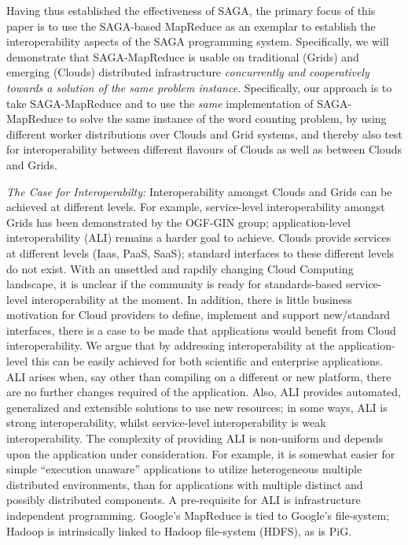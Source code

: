 \documentclass[conference,final]{IEEEtran}
\newcommand{\sagamapreduce }{SAGA-MapReduce }
\begin{document}
Having thus established the effectiveness of SAGA, the primary focus
of this paper is to use the SAGA-based MapReduce as an exemplar to
establish the interoperability aspects of the SAGA programming system.
Specifically, we will demonstrate that \sagamapreduce is usable on
traditional (Grids) and emerging (Clouds) distributed infrastructure
{\it concurrently and cooperatively towards a solution of the same
  problem instance}.  Specifically, our approach is to take
\sagamapreduce and to use the {\it same} implementation of
\sagamapreduce to solve the same instance of the word counting
problem, by using different worker distributions over Clouds and Grid
systems, and thereby also test for interoperability between different
flavours of Clouds as well as between Clouds and Grids.

{\it The Case for Interoperabilty:} Interoperability amongst Clouds
and Grids can be achieved at different levels. For example,
service-level interoperability amongst Grids has been demonstrated by
the OGF-GIN group; application-level interoperability (ALI) remains a
harder goal to achieve.  Clouds provide services at different levels
(Iaas, PaaS, SaaS); standard interfaces to these different levels do
not exist.  With an unsettled and rapdily changing Cloud Computing
landscape, it is unclear if the community is ready for standards-based
service-level interoperability at the moment.  In addition, there is
little business motivation for Cloud providers to define, implement
and support new/standard interfaces, there is a case to be made that
applications would benefit from Cloud interoperability.  We argue that
by addressing interoperability at the application-level this can be
easily achieved for both scientific and enterprise
applications.  %
ALI arises when, say other than compiling on a different or new
platform, there are no further changes required of the
application. Also, ALI provides automated, generalized and extensible
solutions to use new resources; in some ways, ALI is strong
interoperability, whilst service-level interoperability is weak
interoperability.  The complexity of providing ALI is non-uniform and
depends upon the application under consideration. For example, it is
somewhat easier for simple ``execution unaware'' applications to
utilize heterogeneous multiple distributed environments, than for
applications with multiple distinct and possibly distributed
components. A pre-requisite for ALI is infrastructure independent
programming. Google's MapReduce is tied to Google's file-system;
Hadoop is intrinsically linked to Hadoop file-system (HDFS), as is
PiG.
\end{document}
